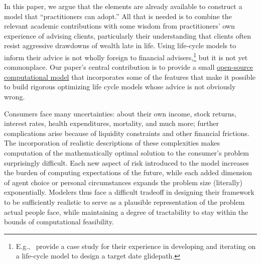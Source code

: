 \documentclass[12pt,letterpaper, fleqn]{article}
\begin{document}
In this paper, we argue that the elements are already available to construct a model that ``practitioners can adopt.''
All that is needed is to combine the relevant academic contributions with some wisdom from practitioners' own experience of advising clients, particularly their understanding that clients often resist aggressive drawdowns of wealth late in life.
Using life-cycle models to inform their advice is not wholly foreign to financial advisers,\footnote{E.g.,\ \cite{Lanski2022} provide a case study for their experience in developing and iterating on a life-cycle model to design a target date glidepath.} but it is not yet commonplace.
Our paper's central contribution is to provide a small \href{https://github.com/econ-ark/life-cycle-prime-time}{open-source computational model} that incorporates some of the features that make it possible to build rigorous optimizing life cycle models whose advice is not obviously wrong.

Consumers face many uncertainties: about their own income, stock returns, interest rates, health expenditures, mortality, and much more;
further complications arise because of liquidity constraints and other financial frictions.
The incorporation of realistic descriptions of these complexities makes computation of the mathematically optimal solution to the consumer's problem surprisingly difficult.
Each new aspect of risk introduced to the model increases the burden of computing expectations of the future, while each added dimension of agent choice or personal circumstances expands the problem size (literally) exponentially.
Modelers thus face a difficult tradeoff in designing their framework to be sufficiently realistic to serve as a plausible representation of the problem actual people face, while maintaining a degree of tractability to stay within the bounds of computational feasibility.
\end{document}
